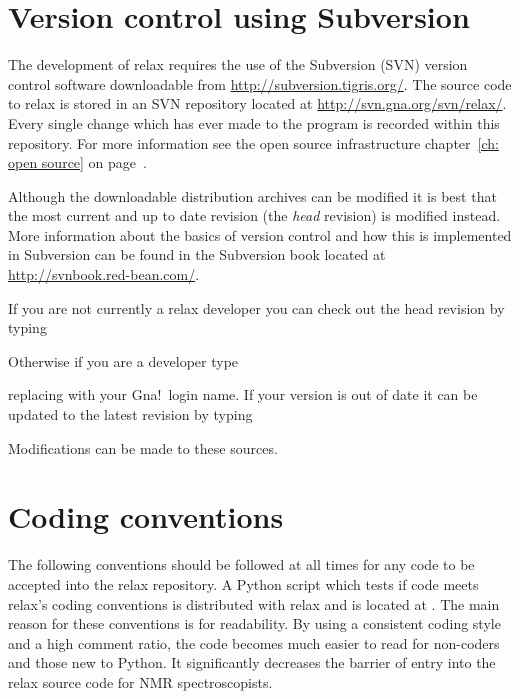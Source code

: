 
\section{Version control using Subversion}\label{svn repository}

The development of relax requires the use of the Subversion (SVN) version control software downloadable from \href{http://subversion.tigris.org/}{http://subversion.tigris.org/}.
The source code to relax is stored in an SVN repository located at \href{http://svn.gna.org/svn/relax/}{http://svn.gna.org/svn/relax/}.
Every single change which has ever made to the program is recorded within this repository.
For more information see the open source infrastructure chapter~\ref{ch: open source} on page~\pageref{ch: open source}.

Although the downloadable distribution archives can be modified it is best that the most current and up to date revision (the \textit{head} revision) is modified instead.
More information about the basics of version control and how this is implemented in Subversion can be found in the Subversion book located at \href{http://svnbook.red-bean.com/}{http://svnbook.red-bean.com/}.

If you are not currently a relax developer you can check out the head revision by typing


Otherwise if you are a developer type


replacing  with your Gna!\ login name.
If your version is out of date it can be updated to the latest revision by typing


Modifications can be made to these sources.




\section{Coding conventions}

The following conventions should be followed at all times for any code to be accepted into the relax repository.
A Python script which tests if code meets relax's coding conventions is distributed with relax and is located at .
The main reason for these conventions is for readability.
By using a consistent coding style and a high comment ratio, the code becomes much easier to read for non-coders and those new to Python.
It significantly decreases the barrier of entry into the relax source code for NMR spectroscopists.



